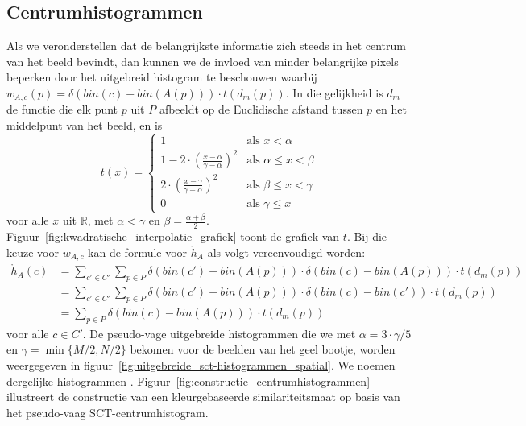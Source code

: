 \subsection{Centrumhistogrammen}

Als we veronderstellen dat
de belangrijkste informatie zich steeds in het centrum van het beeld bevindt, dan kunnen we
de invloed van minder belangrijke pixels beperken door het uitgebreid histogram te beschouwen waarbij
$w_{A,c}(p)=\delta(bin(c)-bin(A(p))) \cdot t(d_m(p))$. In die gelijkheid is $d_m$ de functie die 
elk punt $p$ uit $P$ afbeeldt op de Euclidische afstand tussen $p$ en het middelpunt van het beeld, 
en is
\begin{displaymath}
t(x) = \begin{cases}
1 & \textrm{als } x < \alpha \\
1 - 2 \cdot \left( \frac{x-\alpha}{\gamma - \alpha} \right)^2 & \textrm{als } \alpha \le x < \beta \\[6pt]
2 \cdot \left( \frac{x-\gamma}{\gamma - \alpha} \right)^2 & \textrm{als } \beta \le x < \gamma \\
0 & \textrm{als } \gamma \le x
\end{cases}
\end{displaymath}
voor alle $x$ uit $\mathbb{R}$, met $\alpha < \gamma$ en $\beta=\frac{\alpha + \beta}{2}$. 
Figuur~\ref{fig:kwadratische_interpolatie_grafiek} toont de grafiek van $t$. Bij
die keuze voor $w_{A,c}$ kan de formule voor $\mathring{h}_A$ als volgt vereenvoudigd worden:
\begin{align*}
\mathring{h}_A(c)
 & = \displaystyle \sum_{c' \in C'} \sum_{p \in P} \delta (bin(c')-bin(A(p))) \cdot \delta (bin(c)-bin(A(p))) \cdot t(d_m(p)) \\
 & = \displaystyle \sum_{c' \in C'} \sum_{p \in P} \delta (bin(c')-bin(A(p))) \cdot \delta (bin(c)-bin(c')) \cdot t(d_m(p)) \\
 & = \displaystyle \sum_{p \in P} \delta (bin(c)-bin(A(p))) \cdot t(d_m(p))
\end{align*}
voor alle $c \in C'$. De pseudo-vage uitgebreide
histogrammen die we met $\alpha=3 \cdot \gamma / 5$ en $\gamma = \min\{M/2, N/2\}$ bekomen voor 
de beelden van het geel bootje, worden weergegeven in
figuur~\ref{fig:uitgebreide_sct-histogrammen_spatial}. We noemen dergelijke histogrammen
. Figuur~\ref{fig:constructie_centrumhistogrammen} illustreert
de constructie van een kleurgebaseerde similariteitsmaat op basis van het pseudo-vaag 
SCT-centrumhistogram.

